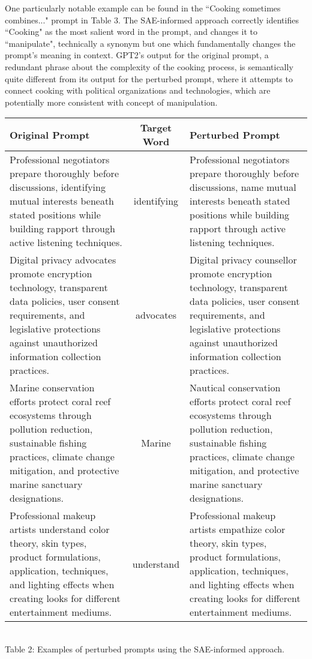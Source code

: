 \documentclass{article}
\begin{document}
One particularly notable example can be found in the ``Cooking sometimes combines..." prompt in Table 3. The SAE-informed approach correctly identifies ``Cooking" as the most salient word in the prompt, and changes it to ``manipulate", technically a synonym but one which fundamentally changes the prompt's meaning in context. GPT2's output for the original prompt, a redundant phrase about the complexity of the cooking process, is semantically quite different from its output for the perturbed prompt, where it attempts to connect cooking with political organizations and technologies, which are potentially more consistent with concept of manipulation.

\begin{center}
\begin{tabular}{|p{6cm} | c | p{6cm}|}
 \hline
Original Prompt & Target Word & Perturbed Prompt \\
 \hline
 Professional negotiators prepare thoroughly before discussions, identifying mutual interests beneath stated positions while building rapport through active listening techniques. & identifying &  Professional negotiators prepare thoroughly before discussions, name mutual interests beneath stated positions while building rapport through active listening techniques. \\ 
 \hline
 Digital privacy advocates promote encryption technology, transparent data policies, user consent requirements, and legislative protections against unauthorized information collection practices. & advocates &  Digital privacy counsellor promote encryption technology, transparent data policies, user consent requirements, and legislative protections against unauthorized information collection practices. \\
 \hline
Marine conservation efforts protect coral reef ecosystems through pollution reduction, sustainable fishing practices, climate change mitigation, and protective marine sanctuary designations. & Marine & Nautical conservation efforts protect coral reef ecosystems through pollution reduction, sustainable fishing practices, climate change mitigation, and protective marine sanctuary designations.\\
\hline
Professional makeup artists understand color theory, skin types, product formulations, application, techniques, and lighting effects when creating looks for different entertainment mediums. & understand & Professional makeup artists empathize color theory, skin types, product formulations, application, techniques, and lighting effects when creating looks for different entertainment mediums. \\
\hline
\end{tabular} 
\scriptsize
    \\ Table 2: Examples of perturbed prompts using the SAE-informed approach.
\end{center}
\end{document}
